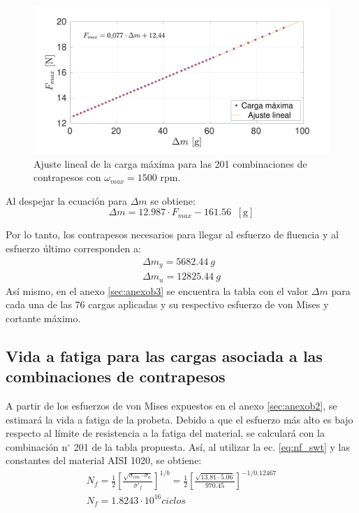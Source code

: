 \begin{figure}[h]
\centering
\includegraphics[width=1\linewidth, trim={1cm 0cm 2cm 0cm}, clip]{Imagenes/fmax_dmec.pdf}
\caption{Ajuste lineal de la carga máxima para las 201 combinaciones de contrapesos con $\omega_{max}=1500$ rpm.}
\label{fig:fmax_dmec}
\end{figure}
Al despejar la ecuación para $\Delta m$ se obtiene: 
\begin{equation}\label{eq:deltam}
	\Delta m = 12.987\cdot F_{max} - 161.56 \;\; [\text{g}]
\end{equation}

Por lo tanto, los contrapesos necesarios para llegar al esfuerzo de fluencia y al esfuerzo último corresponden a:
\begin{gather*}
	\Delta m_y = 5682.44 \: g \\
	\Delta m_u = 12825.44 \: g
\end{gather*}
Así mismo, en el anexo \ref{sec:anexob3} se encuentra la tabla con el valor $\Delta m$ para cada una de las 76 cargas aplicadas y su respectivo esfuerzo de von Mises y cortante máximo.

\subsection{Vida a fatiga para las cargas asociada a las combinaciones de contrapesos}

A partir de los esfuerzos de von Mises expuestos en el anexo \ref{sec:anexob2}, se estimará la vida a fatiga de la probeta. Debido a que el esfuerzo más alto es bajo respecto al límite de resistencia a la fatiga del material, se calculará con la combinación n$^{\circ}$ 201 de la tabla propuesta. Así, al utilizar la ec. \ref{eq:nf_swt} y las constantes del material AISI 1020, se obtiene:
\begin{gather*}
	N_f = \frac{1}{2} \left[\frac{\sqrt{\sigma_{vm}\cdot \sigma_a}}{\sigma'_f} \right]^{1/b} = \frac{1}{2} \left[\frac{\sqrt{13.81\cdot 5.06}}{970.45} \right]^{-1/0.12467} \\
	N_f = 1.8243 \cdot 10^{16} ciclos
\end{gather*}

